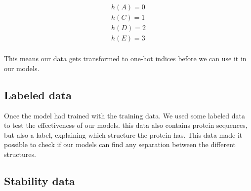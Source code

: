 \begin{align}
h(A) = 0 \\
h(C) = 1 \\
h(D) = 2 \\
h(E) = 3 \\
\end{align}

\noindent
This means our data gets transformed to one-hot indices before we can use it in our models.

\subsection{Labeled data}
Once the model had trained with the training data. We used some labeled data to test the effectiveness of our models. this data also contains protein sequences, but also a label, explaining which structure the protein has. This data made it possible to check if our models can find any separation between the different structures.


\subsection{Stability data}
